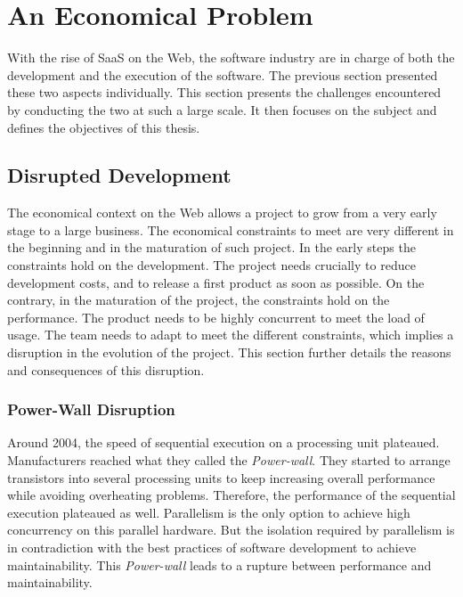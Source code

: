 \section{An Economical Problem} \label{chapter2:problem-statement}

With the rise of SaaS on the Web, the software industry are in charge of both the development and the execution of the software.
The previous section presented these two aspects individually.
This section presents the challenges encountered by conducting the two at such a large scale.
It then focuses on the subject and defines the objectives of this thesis.

\subsection{Disrupted Development}

The economical context on the Web allows a project to grow from a very early stage to a large business.
The economical constraints to meet are very different in the beginning and in the maturation of such project.
In the early steps the constraints hold on the development.
The project needs crucially to reduce development costs, and to release a first product as soon as possible.
On the contrary, in the maturation of the project, the constraints hold on the performance.
The product needs to be highly concurrent to meet the load of usage.
The team needs to adapt to meet the different constraints, which implies a disruption in the evolution of the project.
This section further details the reasons and consequences of this disruption.

\subsubsection{Power-Wall Disruption}


Around 2004, the speed of sequential execution on a processing unit plateaued.
Manufacturers reached what they called the \textit{Power-wall}.
They started to arrange transistors into several processing units to keep increasing overall performance while avoiding overheating problems.
Therefore, the performance of the sequential execution plateaued as well.
Parallelism is the only option to achieve high concurrency on this parallel hardware.
But the isolation required by parallelism is in contradiction with the best practices of software development to achieve maintainability.
This \textit{Power-wall} leads to a rupture between performance and maintainability.

